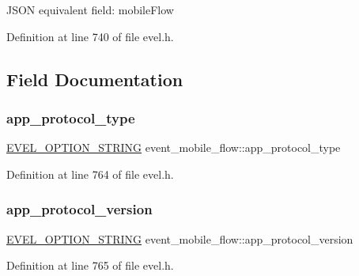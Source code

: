 J\+S\+ON equivalent field\+: mobile\+Flow 

Definition at line 740 of file evel.\+h.



\subsection{Field Documentation}
\hypertarget{structevent__mobile__flow_a6e64b8dd7f8a2ddc9b74978f1eb35227}{}\label{structevent__mobile__flow_a6e64b8dd7f8a2ddc9b74978f1eb35227} 
\subsubsection{\texorpdfstring{app\+\_\+protocol\+\_\+type}{app\_protocol\_type}}
{\footnotesize\ttfamily \hyperlink{evel_8h_a0de5113a7b72de93c0c7b644f7ea7ec3}{E\+V\+E\+L\+\_\+\+O\+P\+T\+I\+O\+N\+\_\+\+S\+T\+R\+I\+NG} event\+\_\+mobile\+\_\+flow\+::app\+\_\+protocol\+\_\+type}



Definition at line 764 of file evel.\+h.

\hypertarget{structevent__mobile__flow_a3eeb397d0b7f1999d602092cf36bd65c}{}\label{structevent__mobile__flow_a3eeb397d0b7f1999d602092cf36bd65c} 
\subsubsection{\texorpdfstring{app\+\_\+protocol\+\_\+version}{app\_protocol\_version}}
{\footnotesize\ttfamily \hyperlink{evel_8h_a0de5113a7b72de93c0c7b644f7ea7ec3}{E\+V\+E\+L\+\_\+\+O\+P\+T\+I\+O\+N\+\_\+\+S\+T\+R\+I\+NG} event\+\_\+mobile\+\_\+flow\+::app\+\_\+protocol\+\_\+version}



Definition at line 765 of file evel.\+h.

\hypertarget{structevent__mobile__flow_a25248fddf2e96c1692b26b7c5247cc30}{}\label{structevent__mobile__flow_a25248fddf2e96c1692b26b7c5247cc30} 
